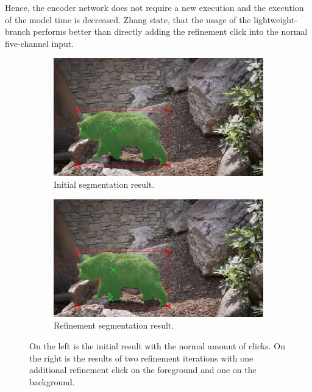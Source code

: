 Hence, the encoder network does not require a new execution and the execution of the model time is decreased.
Zhang \etal state, that the usage of the lightweight-branch performs better than directly adding the refinement click into the normal five-channel input.

\begin{figure} 
	\centering
	\begin{subfigure}[b]{0.45\textwidth}
		\centering
		\includegraphics[width=\textwidth]{figures/chap34_bear_6.png}
		\caption{Initial segmentation result.}
		\label{fig:ch3:sec4:refinement_1}
	\end{subfigure}
	\hfill
	\begin{subfigure}[b]{0.45\textwidth}
		\centering
		\includegraphics[width=\textwidth]{figures/chap34_bear_8.png}
		\caption{Refinement segmentation result.}
		\label{fig:ch3:sec4:refinement_2}
	\end{subfigure}
	\caption[IOG Refinement]{
		On the left is the initial result with the normal amount of clicks. 
		On the right is the results of two refinement iterations with one additional refinement click on the foreground and one on the background.
	} \label{fig:ch3:sec4:refinement}
\end{figure}


